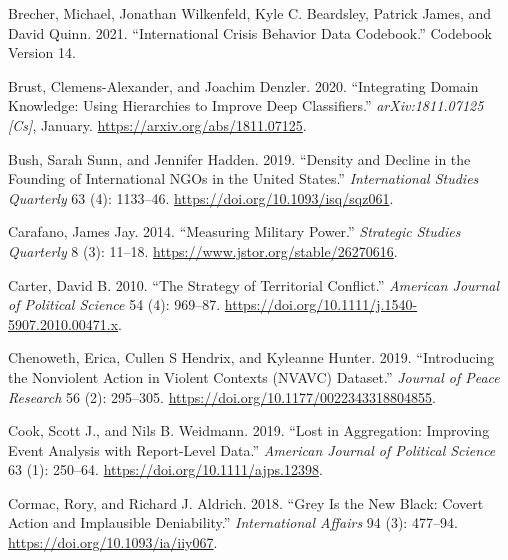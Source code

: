\documentclass{article}
\newlength{\cslhangindent}
\newlength{\cslentryspacingunit} %
\newenvironment{CSLReferences}[2] %
 {%
  \setlength{\parindent}{0pt}
  \ifodd #1
  \let\oldpar\par
  \def\par{\hangindent=\cslhangindent\oldpar}
  \fi
  \setlength{\parskip}{#2\cslentryspacingunit}
 }%
 {}
\begin{document}
\begin{CSLReferences}{1}{0}
\leavevmode{}%
Brecher, Michael, Jonathan Wilkenfeld, Kyle C. Beardsley, Patrick James,
and David Quinn. 2021. {``International {Crisis Behavior Data
Codebook}.''} Codebook Version 14.

\leavevmode{}%
Brust, Clemens-Alexander, and Joachim Denzler. 2020. {``Integrating
Domain Knowledge: Using Hierarchies to Improve Deep Classifiers.''}
\emph{arXiv:1811.07125 {[}Cs{]}}, January.
\url{https://arxiv.org/abs/1811.07125}.

\leavevmode{}%
Bush, Sarah Sunn, and Jennifer Hadden. 2019. {``Density and {Decline} in
the {Founding} of {International NGOs} in the {United States}.''}
\emph{International Studies Quarterly} 63 (4): 1133--46.
\url{https://doi.org/10.1093/isq/sqz061}.

\leavevmode{}%
Carafano, James Jay. 2014. {``Measuring {Military Power}.''}
\emph{Strategic Studies Quarterly} 8 (3): 11--18.
\url{https://www.jstor.org/stable/26270616}.

\leavevmode{}%
Carter, David B. 2010. {``The {Strategy} of {Territorial Conflict}.''}
\emph{American Journal of Political Science} 54 (4): 969--87.
\url{https://doi.org/10.1111/j.1540-5907.2010.00471.x}.

\leavevmode{}%
Chenoweth, Erica, Cullen S Hendrix, and Kyleanne Hunter. 2019.
{``Introducing the {Nonviolent Action} in {Violent Contexts} ({NVAVC})
Dataset.''} \emph{Journal of Peace Research} 56 (2): 295--305.
\url{https://doi.org/10.1177/0022343318804855}.

\leavevmode{}%
Cook, Scott J., and Nils B. Weidmann. 2019. {``Lost in {Aggregation}:
{Improving Event Analysis} with {Report-Level Data}.''} \emph{American
Journal of Political Science} 63 (1): 250--64.
\url{https://doi.org/10.1111/ajps.12398}.

\leavevmode{}%
Cormac, Rory, and Richard J. Aldrich. 2018. {``Grey Is the New Black:
Covert Action and Implausible Deniability.''} \emph{International
Affairs} 94 (3): 477--94. \url{https://doi.org/10.1093/ia/iiy067}.


\end{CSLReferences}
\end{document}
